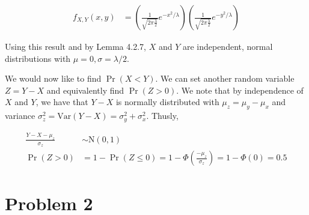 \documentclass[11pt]{article}
\begin{document}
\begin{align*}
  f_{X,Y}(x,y) &= \left( \frac{1}{\sqrt{2 \pi \frac{\lambda}{2}}} e^{-x^2/\lambda}
                 \right) \left( \frac{1}{\sqrt{2 \pi \frac{\lambda}{2}}} e^{-y^2/\lambda} \right)
\end{align*}

Using this result and by Lemma 4.2.7, $X$ and $Y$ are independent, normal
distributions with $\mu = 0, \sigma = \lambda/2$.

We would now like to find $\Pr{(X < Y)}$.  We can set another random
variable $Z = Y - X$ and equivalently find $\Pr{(Z > 0)}$.  We note that
by independence of $X$ and $Y$, we have that $Y-X$ is normally
distributed with $\mu_z = \mu_y - \mu_x$ and variance $\sigma_z^2 =
\mathrm{Var}(Y-X) = \sigma_y^2 + \sigma_x^2$.  Thusly,

\begin{align*}
  \frac{Y-X-\mu_z}{\sigma_z} &\sim \mathrm{N}(0,1) \\
  \Pr{(Z > 0)} &= 1 - \Pr{(Z \le 0)} = 1 - \Phi \left(
                  \frac{-\mu_z}{\sigma_z} \right) = 1 - \Phi (0) = 0.5
\end{align*}

\section*{Problem 2}
\end{document}
